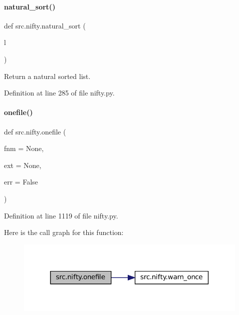 \paragraph{\texorpdfstring{natural\+\_\+sort()}{natural\_sort()}}
{\footnotesize\ttfamily def src.\+nifty.\+natural\+\_\+sort (\begin{DoxyParamCaption}\item[{}]{l }\end{DoxyParamCaption})}



Return a natural sorted list. 



Definition at line 285 of file nifty.\+py.

\mbox{\label{namespacesrc_1_1nifty_aa751e61b12e5549898f8e1b03c3cb74b}} 
\paragraph{\texorpdfstring{onefile()}{onefile()}}
{\footnotesize\ttfamily def src.\+nifty.\+onefile (\begin{DoxyParamCaption}\item[{}]{fnm = {\ttfamily None},  }\item[{}]{ext = {\ttfamily None},  }\item[{}]{err = {\ttfamily False} }\end{DoxyParamCaption})}



Definition at line 1119 of file nifty.\+py.

Here is the call graph for this function\+:
\nopagebreak
\begin{figure}[H]
\begin{center}
\leavevmode
\includegraphics[width=317pt]{namespacesrc_1_1nifty_aa751e61b12e5549898f8e1b03c3cb74b_cgraph}
\end{center}
\end{figure}
\mbox{\label{namespacesrc_1_1nifty_a2fb154ca0d5eff83ab20887cee6d9cef}} 
